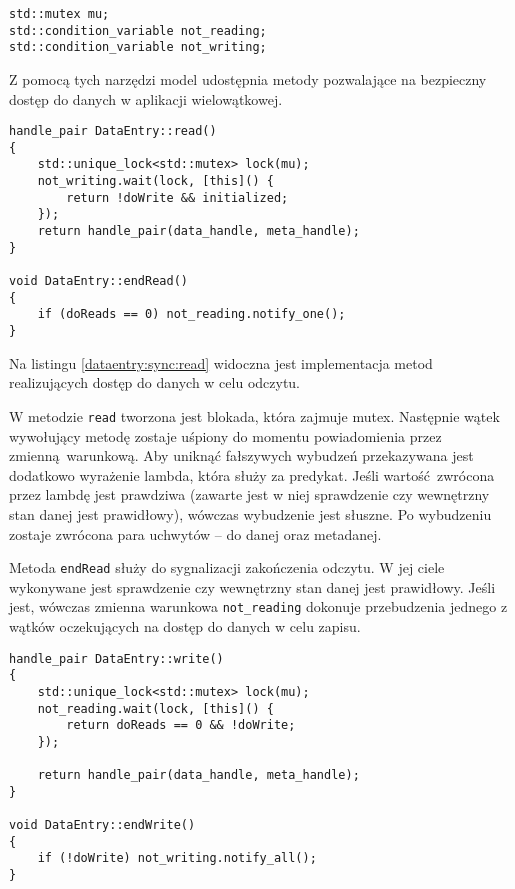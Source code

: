 \begin{minipage}{\textwidth}
	\begin{lstlisting}[label=dataentry:sync, caption={Składowe klasy \lstinline$DataEntry$ zapewniające bezpieczne użycie w środowisku wielowątkowym},alsoletter={()[].=}]
std::mutex mu;
std::condition_variable not_reading;
std::condition_variable not_writing;
	\end{lstlisting}
\end{minipage}

Z pomocą tych narzędzi model udostępnia metody pozwalające na bezpieczny dostęp do danych w aplikacji wielowątkowej.

\begin{minipage}{\textwidth}
	\begin{lstlisting}[label=dataentry:sync:read, caption={Metody klasy \lstinline$DataEntry$ zapewniające bezpieczny odczyt danych współdzielonych w środowisku wielowątkowym},alsoletter={()[].=}]
handle_pair DataEntry::read()
{
	std::unique_lock<std::mutex> lock(mu);
	not_writing.wait(lock, [this]() {
		return !doWrite && initialized;
	});
	return handle_pair(data_handle, meta_handle);
}

void DataEntry::endRead()
{
	if (doReads == 0) not_reading.notify_one();
}
	\end{lstlisting}
\end{minipage}

Na listingu \ref{dataentry:sync:read} widoczna jest implementacja metod realizujących dostęp do danych w celu odczytu. 

W metodzie \lstinline$read$ tworzona jest blokada, która zajmuje mutex. Następnie wątek wywołujący metodę zostaje uśpiony do momentu powiadomienia przez zmienną warunkową. Aby uniknąć fałszywych wybudzeń przekazywana jest dodatkowo wyrażenie lambda, która służy za predykat. Jeśli wartość zwrócona przez lambdę jest prawdziwa (zawarte jest w niej sprawdzenie czy wewnętrzny stan danej jest prawidłowy), wówczas wybudzenie jest słuszne. Po wybudzeniu zostaje zwrócona para uchwytów -- do danej oraz metadanej.

Metoda \lstinline$endRead$ służy do sygnalizacji zakończenia odczytu. W jej ciele wykonywane jest sprawdzenie czy wewnętrzny stan danej jest prawidłowy. Jeśli jest, wówczas zmienna warunkowa \lstinline$not_reading$ dokonuje przebudzenia jednego z wątków oczekujących na dostęp do danych w celu zapisu.

\begin{minipage}{\textwidth}
	\begin{lstlisting}[label=dataentry:sync:write, caption={Metody klasy \lstinline$DataEntry$ zapewniające bezpieczny zapis danych współdzielonych w środowisku wielowątkowym},alsoletter={()[].=}]
handle_pair DataEntry::write()
{
	std::unique_lock<std::mutex> lock(mu);
	not_reading.wait(lock, [this]() {
		return doReads == 0 && !doWrite;
	});

	return handle_pair(data_handle, meta_handle);
}

void DataEntry::endWrite()
{
	if (!doWrite) not_writing.notify_all();
}
	\end{lstlisting}
\end{minipage}

